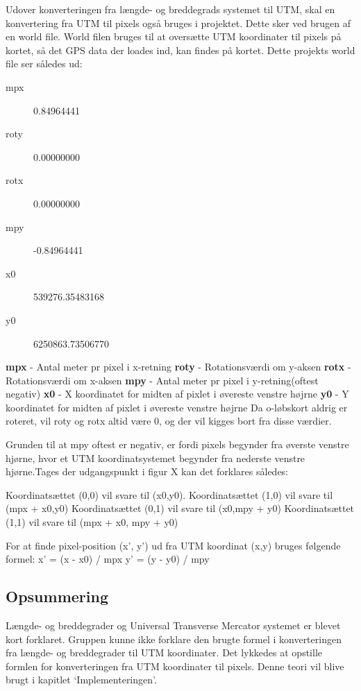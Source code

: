 Udover konverteringen fra længde- og breddegrads systemet til UTM, skal en konvertering fra UTM til pixels også bruges i projektet. Dette sker ved brugen af en world file. World filen bruges til at oversætte UTM koordinater til pixels på kortet, så det GPS data der loades ind, kan findes på kortet. Dette projekts world file ser således ud:
\begin{description}
	\item[mpx] 0.84964441
	\item[roty] 0.00000000
	\item[rotx] 0.00000000
	\item[mpy] -0.84964441
	\item[x0] 539276.35483168
	\item[y0] 6250863.73506770
\end{description}
\textbf{mpx} - Antal meter pr pixel i x-retning\newline
\textbf{roty} - Rotationsværdi om y-aksen\newline
\textbf{rotx} - Rotationsværdi om x-aksen\newline
\textbf{mpy} - Antal meter pr pixel i y-retning(oftest negativ)\newline
\textbf{x0} - X koordinatet for midten af pixlet i øvereste venstre højrne\newline
\textbf{y0} - Y koordinatet for midten af pixlet i øvereste venstre højrne\newline
Da o-løbskort aldrig er roteret, vil roty og rotx altid være 0, og der vil kigges bort fra disse værdier.

Grunden til at mpy oftest er negativ, er fordi pixels begynder fra øverste venstre hjørne, hvor et UTM koordinatsystemet begynder fra nederste venstre hjørne.Tages der udgangspunkt i figur X kan det forklares således:

Koordinatsættet (0,0) vil svare til (x0,y0).
Koordinatsættet (1,0) vil svare til (mpx + x0,y0)
Koordinatsættet (0,1) vil svare til (x0,mpy + y0)
Koordinatsættet (1,1) vil svare til (mpx + x0, mpy + y0)

For at finde pixel-position (x’, y’) ud fra UTM koordinat (x,y) bruges følgende formel:\newline
x’ = (x - x0) / mpx\newline
y’ = (y - y0) / mpy\newline

\subsection{Opsummering}
Længde- og breddegrader og Universal Transverse Mercator systemet er blevet kort forklaret. Gruppen kunne ikke forklare den brugte formel i konverteringen fra længde- og breddegrader til UTM koordinater. Det lykkedes at opstille formlen for konverteringen fra UTM koordinater til pixels. Denne teori vil blive brugt i kapitlet ‘Implementeringen’. 



